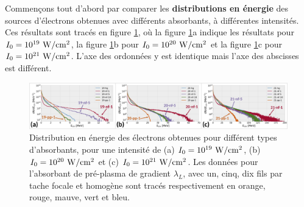 \begin{refsection}
Commençons tout d'abord par comparer les \textbf{distributions en énergie} des sources d'électrons obtenues avec différents absorbants, à différentes intensités. Ces résultats sont tracés en figure \ref{fig:62-distrib_energie_electrons}, où la figure \ref{fig:62-distrib_energie_electrons}a indique les résultats pour $I_0 = 10^{19} ~ \rm W/cm^2$, la figure \ref{fig:62-distrib_energie_electrons}b pour $I_0 = 10^{20} ~ \rm W/cm^2$ et la figure \ref{fig:62-distrib_energie_electrons}c pour $I_0 = 10^{21} ~ \rm W/cm^2$. L'axe des ordonnées y est identique mais l'axe des abscisses est différent.

\begin{figure}[hbtp]
	\centering
	\includegraphics[width=\linewidth]{6-opti_numerique/distribution_energie_electrons.png}
	\caption{Distribution en énergie des électrons obtenues pour différent types d'absorbants, pour une intensité de (a) $I_0=10^{19} ~ \rm W/cm^2$, (b) $I_0=10^{20} ~ \rm W/cm^2$ et  (c) $I_0=10^{21} ~ \rm W/cm^2$. Les données pour l'absorbant de pré-plasma de gradient $\lambda_L$, avec un, cinq, dix fils par tache focale et homogène sont tracés respectivement en orange, rouge, mauve, vert et bleu.}
	\label{fig:62-distrib_energie_electrons}
\end{figure}


\end{refsection}
